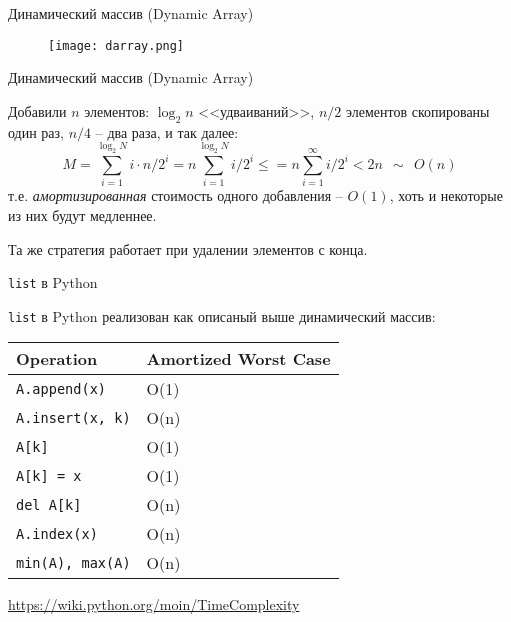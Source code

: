 \begin{frame}{Динамический массив (Dynamic Array)}
  
\begin{figure}
  \centering
  \texttt{[image: darray.png]}
\end{figure}

\end{frame}


\begin{frame}{Динамический массив (Dynamic Array)}
  
Добавили $n$ элементов: $\log_2{n}$ <<удваиваний>>, $n/2$ элементов скопированы один раз, $n/4$ -- два раза, и так далее:
  $$
  M = \sum_{i=1}^{\log_2{N}} i \cdot n/2^i
    = n \sum_{i=1}^{\log_2{N}} i/2^i \leqslant
    = n \sum_{i=1}^{\infty} i/2^i < 2n ~~\sim~~O(n)
  $$
т.е. {\em амортизированная} стоимость одного добавления -- $O(1)$, хоть и некоторые из них будут медленнее.

Та же стратегия работает при удалении элементов с конца.

\end{frame}


\begin{frame}{\texttt{list} в Python}

\texttt{list} в Python реализован как описаный выше динамический массив:

\begin{table}
    \begin{tabular}{l|l}
    \hline
    Operation      & Amortized Worst Case \\ \hline
    \texttt{A.append(x)}    & O(1)                 \\ \hline
    \texttt{A.insert(x, k)} & O(n)                 \\ \hline
    \texttt{A[k]}           & O(1)                 \\ \hline
    \texttt{A[k] = x}       & O(1)                 \\ \hline
    \texttt{del A[k]}       & O(n)                 \\ \hline
    \texttt{A.index(x)}     & O(n)                 \\ \hline
    \texttt{min(A), max(A)} & O(n)                 \\ \hline
    \end{tabular}
\end{table}

\url{https://wiki.python.org/moin/TimeComplexity}

\end{frame}

